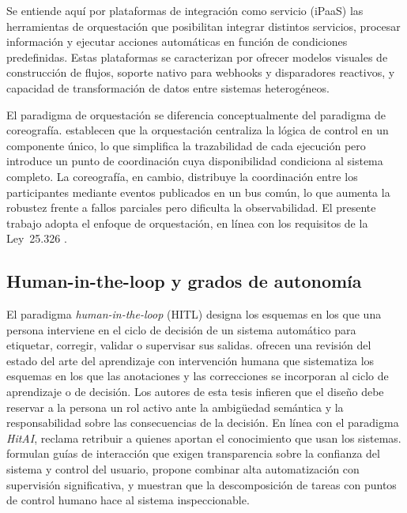 Se entiende aquí por plataformas de integración como servicio (iPaaS) las herramientas de orquestación que posibilitan integrar distintos servicios, procesar información y ejecutar acciones automáticas en función de condiciones predefinidas. Estas plataformas se caracterizan por ofrecer modelos visuales de construcción de flujos, soporte nativo para webhooks y disparadores reactivos, y capacidad de transformación de datos entre sistemas heterogéneos.

El paradigma de orquestación se diferencia conceptualmente del paradigma de coreografía. \textcite{Hohpe2004_eip} establecen que la orquestación centraliza la lógica de control en un componente único, lo que simplifica la trazabilidad de cada ejecución pero introduce un punto de coordinación cuya disponibilidad condiciona al sistema completo. La coreografía, en cambio, distribuye la coordinación entre los participantes mediante eventos publicados en un bus común, lo que aumenta la robustez frente a fallos parciales pero dificulta la observabilidad. El presente trabajo adopta el enfoque de orquestación, en línea con los requisitos de la Ley~25.326 \parencite{Ley25326_2000}.

\subsection{Human-in-the-loop y grados de autonomía}\label{subsec:human-in-the-loop}

El paradigma \emph{human-in-the-loop} (HITL) designa los esquemas en los que una persona interviene en el ciclo de decisión de un sistema automático para etiquetar, corregir, validar o supervisar sus salidas. \textcite{MosqueiraRey2023_human_in_the_loop} ofrecen una revisión del estado del arte del aprendizaje con intervención humana que sistematiza los esquemas en los que las anotaciones y las correcciones se incorporan al ciclo de aprendizaje o de decisión. Los autores de esta tesis infieren que el diseño debe reservar a la persona un rol activo ante la ambigüedad semántica y la responsabilidad sobre las consecuencias de la decisión. En línea con el paradigma \emph{HitAI}, \textcite[p.~243]{Zanzotto2019_human_in_the_loop} reclama retribuir a quienes aportan el conocimiento que usan los sistemas. \textcite{Amershi2019_human_ai} formulan guías de interacción que exigen transparencia sobre la confianza del sistema y control del usuario, \textcite{Shneiderman2020_human_centered_ai} propone combinar alta automatización con supervisión significativa, y \textcite{Wu2022_ai_chains} muestran que la descomposición de tareas con puntos de control humano hace al sistema inspeccionable.

